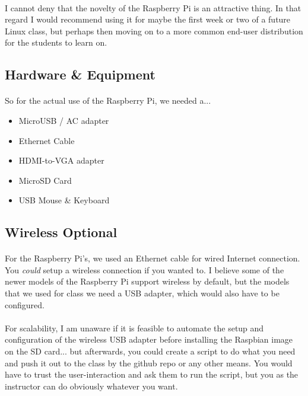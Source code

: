 \documentclass[11pt]{article}
\begin{document}
	\paragraph{} I cannot deny that the novelty of the Raspberry Pi is an attractive thing. In that regard I would recommend using it for maybe the first week or two of a future Linux class, but perhaps then moving on to a more common end-user distribution for the students to learn on. 

	\subsection{Hardware \& Equipment}

	\paragraph{} So for the actual use of the Raspberry Pi, we needed a...

	\begin{itemize}
		\item MicroUSB / AC adapter
		\item Ethernet Cable
		\item HDMI-to-VGA adapter
		\item MicroSD Card
		\item USB Mouse \& Keyboard
	\end{itemize}

	\subsection{Wireless Optional}

	\paragraph{} For the Raspberry Pi's, we used an Ethernet cable for wired Internet connection. You \textit{could} setup a wireless connection if you wanted to. I believe some of the newer models of the Raspberry Pi support wireless by default, but the models that we used for class we need a USB adapter, which would also have to be configured.

	\paragraph{} For scalability, I am unaware if it is feasible to automate the setup and configuration of the wireless USB adapter before installing the Raspbian image on the SD card... but afterwards, you could create a script to do what you need and push it out to the class by the github repo or any other means. You would have to trust the user-interaction and ask them to run the script, but you as the instructor can do obviously whatever you want. 
\end{document}
